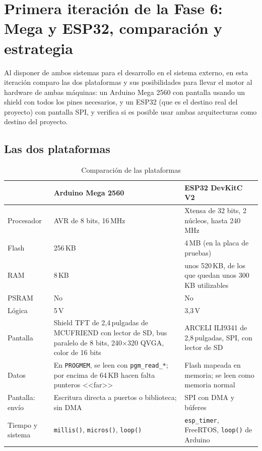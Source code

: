 \section{Primera iteración de la Fase 6: Mega y ESP32, comparación y estrategia}
\label{sec:F6I01}

Al disponer de ambos sistemas para el desarrollo en el sistema externo, en esta iteración comparo las dos plataformas y sus posibilidades para llevar el motor al hardware de ambas máquinas: un Arduino Mega 2560 con pantalla usando un shield con todos los pines necesarios, y un ESP32 (que es el destino real del proyecto) con pantalla SPI, y verifica si es posible usar ambas arquitecturas como destino del proyecto.

\subsection{Las dos plataformas}
\label{sec:F6I01Plataformas}

\begin{table}[H]
	\centering
	\begin{tabular}{lp{5.3cm}p{5.3cm}}
		\toprule
		 & Arduino Mega 2560 & ESP32 DevKitC V2 \\
		\midrule
		Procesador & AVR de 8 bits, 16\,MHz & Xtensa de 32 bits, 2 núcleos, hasta 240\,MHz \\
		Flash & 256\,KB & 4\,MB (en la placa de pruebas) \\
		RAM & 8\,KB & unos 520\,KB, de los que quedan unos 300\,KB utilizables \\
		PSRAM & No & No \\
		Lógica & 5\,V & 3,3\,V \\
		Pantalla & Shield TFT de 2,4\,pulgadas de MCUFRIEND con lector de SD, bus paralelo de 8 bits, 240$\times$320 QVGA, color de 16 bits & ARCELI ILI9341 de 2,8\,pulgadas, SPI, con lector de SD \\
		Datos & En \texttt{PROGMEM}, se leen con \texttt{pgm\_read\_*}; por encima de 64\,KB hacen falta punteros <<far>> & Flash mapeada en memoria; se leen como memoria normal \\
		Pantalla: envío & Escritura directa a puertos o biblioteca; sin DMA & SPI con DMA y búferes \\
		Tiempo y sistema & \texttt{millis()}, \texttt{micros()}, \texttt{loop()} & \texttt{esp\_timer}, FreeRTOS, \texttt{loop()} de Arduino \\
		\bottomrule
	\end{tabular}
	\caption{Comparación de las plataformas}
	\label{tab:F6I01Plataformas}
\end{table}

